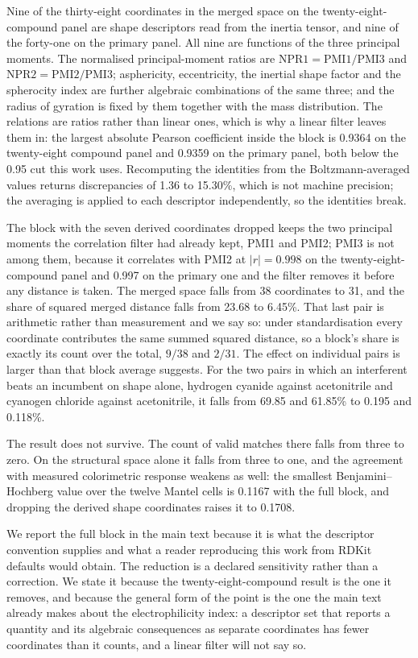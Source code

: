 \documentclass[11pt,a4paper]{article}
\begin{document}
Nine of the thirty-eight coordinates in the merged space on the
twenty-eight-compound panel are shape descriptors read from the inertia tensor,
and nine of the forty-one on the primary panel. All nine are functions of the
three principal moments. The normalised principal-moment ratios are
$\mathrm{NPR1} = \mathrm{PMI1}/\mathrm{PMI3}$ and
$\mathrm{NPR2} = \mathrm{PMI2}/\mathrm{PMI3}$; asphericity, eccentricity, the
inertial shape factor and the spherocity index are further algebraic
combinations of the same three; and the radius of gyration is fixed by them
together with the mass distribution. The relations are ratios rather than linear
ones, which is why a linear filter leaves them in: the largest absolute Pearson
coefficient inside the block is 0.9364 on the twenty-eight compound panel and
0.9359 on the primary panel, both below the 0.95 cut this work uses.
Recomputing the identities from the Boltzmann-averaged values returns
discrepancies of 1.36 to 15.30\%, which is not machine precision; the averaging
is applied to each descriptor independently, so the identities break.

The block with the seven derived coordinates dropped keeps the two
principal moments the
correlation filter had already kept, PMI1 and PMI2; PMI3 is not among them,
because it correlates with PMI2 at $|r| = 0.998$ on the twenty-eight-compound
panel and 0.997 on the primary one and the filter removes it before any
distance is taken. The merged space falls from 38 coordinates to 31, and the
share of squared merged distance falls from 23.68 to 6.45\%. That last pair is
arithmetic rather than measurement and we say so: under standardisation every
coordinate contributes the same summed squared distance, so a block's share is
exactly its count over the total, $9/38$ and $2/31$. The effect on individual
pairs is larger than that block average suggests. For the two pairs in which an
interferent beats an incumbent on shape alone, hydrogen cyanide against
acetonitrile and cyanogen chloride against acetonitrile, it falls from 69.85 and
61.85\% to 0.195 and 0.118\%.

The result does not survive. The count of valid matches there falls from three
to zero. On the structural space alone it falls from three to one, and the
agreement with measured colorimetric response weakens as well: the smallest
Benjamini--Hochberg value over the twelve Mantel cells is 0.1167 with the full
block, and dropping the derived shape coordinates raises it to 0.1708.

We report the full block in the main text because it is what the descriptor
convention supplies and what a reader reproducing this work from RDKit defaults
would obtain. The reduction is a declared sensitivity rather than a correction.
We state it because the twenty-eight-compound result is the one it removes, and
because the general form of the point is the one the main text already makes
about the electrophilicity index: a descriptor set that reports a quantity and
its algebraic consequences as separate coordinates has fewer coordinates than it
counts, and a linear filter will not say so.
\end{document}
